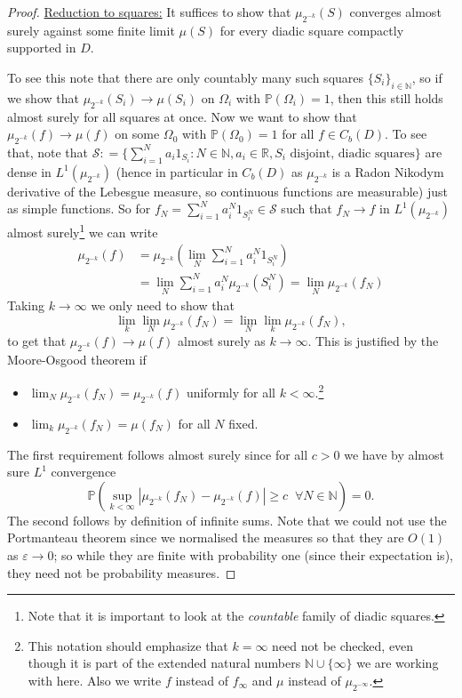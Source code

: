 \documentclass[11pt,reqno]{amsart}
\numberwithin{equation}{section}
\newcommand{\deq}{\mathrel{\mathop:}=}
\newcommand{\eps}{\varepsilon}
\begin{document}
\begin{proof}
	\underline{Reduction to squares:} It suffices to show that $\mu_{2^{-k}}(S)$ converges almost surely against some finite limit $\mu(S)$ for every diadic square compactly supported in $D$.
	
	To see this note that there are only countably many such squares $\{S_i\}_{i\in\mathbb N}$, so if we show that $\mu_{2^{-k}}(S_i)\rightarrow\mu(S_i)$ on $\Omega_i$ with $\mathbb P(\Omega_i)=1$, then this still holds almost surely for all squares at once. Now we want to show that $\mu_{2^{-k}}(f)\rightarrow\mu(f)$ on some $\Omega_0$ with $\mathbb P(\Omega_0)=1$ for all $f\in C_b(D)$. To see that, note that $\mathcal S\deq\{\sum_{i=1}^N a_i 1_{S_i}:N\in\mathbb N, a_i\in\mathbb R, S_i \text{ disjoint, diadic squares}\}$ are dense in $L^1(\mu_{2^{-k}})$ (hence in particular in $C_b(D)$ as $\mu_{2^{-k}}$ is a Radon Nikodym derivative of the Lebesgue measure, so continuous functions are measurable) just as simple functions. So for $f_N = \sum_{i=1}^N a_i^N1_{S_i^N}\in\mathcal S$ such that $f_N\rightarrow f$ in $L^1(\mu_{2^{-k}})$ almost surely\footnote{Note that it is important to look at the \emph{countable} family of diadic squares.} we can write
	\begin{align*}
		\mu_{2^{-k}}(f)&=\mu_{2^{-k}}\left(\lim_N\sum_{i=1}^N a_i^N1_{S_i^N}\right)\\
		&= \lim_N\sum_{i=1}^N a_i^N\mu_{2^{-k}}(S_i^N) =\lim_N \mu_{2^{-k}}(f_N)
	\end{align*}
	Taking $k\rightarrow\infty$ we only need to show that $$\lim_k\lim_N \mu_{2^{-k}}(f_N) = \lim_N\lim_k \mu_{2^{-k}}(f_N),$$
	to get that $\mu_{2^{-k}}(f)\rightarrow \mu(f)$ almost surely as $k\rightarrow\infty$.
	This is justified by the Moore-Osgood theorem if
	\begin{itemize}
		\item $\lim_N \mu_{2^{-k}}(f_N)=\mu_{2^{-k}}(f)$ uniformly for all $k<\infty$.\footnote{This notation should emphasize that $k=\infty$ need not be checked, even though it is part of the extended natural numbers $\mathbb N\cup\{\infty\}$ we are working with here. Also we write $f$ instead of $f_\infty$ and $\mu$ instead of $\mu_{2^{-\infty}}$.}
		\item $\lim_k \mu_{2^{-k}}(f_N)=\mu(f_N)$ for all $N$ fixed.
	\end{itemize}
	The first requirement follows almost surely since for all $c>0$ we have by almost sure $L^1$ convergence $$\mathbb P\left(\sup_{k<\infty}|\mu_{2^{-k}}(f_N)-\mu_{2^{-k}}(f)|\geq c \;\;\forall N\in\mathbb N\right)=0.$$
	The second follows by definition of infinite sums.
	Note that we could not use the Portmanteau theorem since we normalised the measures so that they are $O(1)$ as $\eps\rightarrow 0$; so while they are finite with probability one (since their expectation is), they need not be probability measures.


\end{proof}
\end{document}
